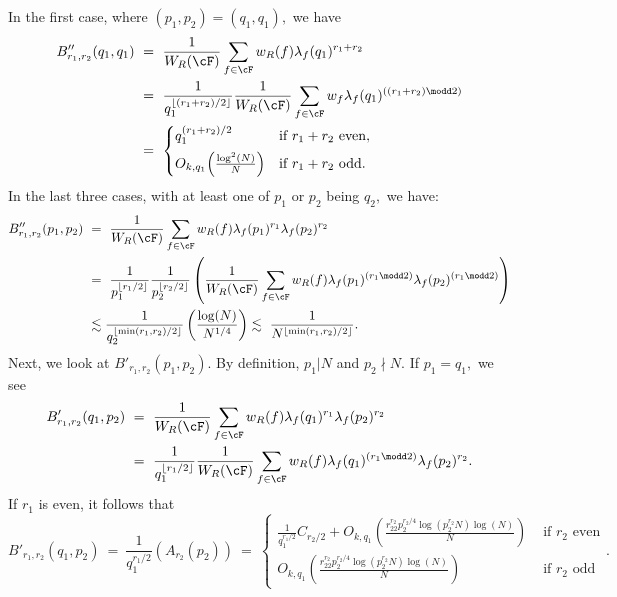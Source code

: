 \documentclass[11pt, reqno]{amsart}
\theoremstyle{definition}
\theoremstyle{remark}
\numberwithin{equation}{section}
\begin{document}
In the first case, where $(p_1 , p_2) = (q_1,q_1),$ we have \begin{align*}
    B''_{r_1,r_2}(q_1,q_1) \ &= \ \frac{1}{W_R(\cF)} \sum_{f \in \cF} w_R(f) \lambda_f(q_1)^{r_1+r_2} \\&= \ \frac{1}{q_1^{\lfloor (r_1+r_2) / 2\rfloor}}\frac{1}{W_R(\cF)}\sum_{f \in \cF} w_f\lambda_f(q_1)^{((r_1+r_2)\modd 2)} \\
   &= \ \begin{cases}
    q_1^{(r_1+r_2) / 2} 
      & \text{if $r_1+r_2$ even}, \\[4pt]
    O_{k,q_1}\!\left(\frac{\log^2(N)}{N}\right) 
      & \text{if $r_1+r_2$ odd}.
\end{cases}
\end{align*}
In the last three cases, with at least one of $p_1$ or $p_2$ being $q_2,$ we have:
\begin{align*}
      B''_{r_1,r_2}(p_1,p_2)\ &=\ \frac{1}{W_R(\cF)} \sum_{f \in \cF} w_R(f) \lambda_f(p_1)^{r_1}\lambda_f(p_2)^{r_2} \\
     \ &=\ \frac{1}{p_1^{\lfloor r_1/2\rfloor}}\frac{1}{p_2^{\lfloor r_2/2\rfloor}}\left(\frac{1}{W_R(\cF)} \sum_{f \in \cF} w_R(f) \lambda_f(p_1)^{(r_1\modd 2)}\lambda_f(p_2)^{(r_1\modd 2)} \right)\\
      &\lesssim \frac{1}{q_2^{\lfloor \min(r_1,r_2)/2 \rfloor}} \left(\frac{\log(N)}{N^{1/4}}\right) \lesssim \ \frac{1}{N^{\lfloor \min(r_1,r_2)/2 \rfloor}}.
\end{align*}
Next, we look at $B'_{r_1,r_2}(p_1,p_2).$ By definition, $p_1 | N$ and $p_2 \nmid N.$ 
If $p_1 = q_1,$ we see
\begin{align*}
    B'_{r_1,r_2}(q_1,p_2)\ &= \ \frac{1}{W_R(\cF)} \sum_{f \in \cF} w_R(f) \lambda_f(q_1)^{r_1}\lambda_f(p_2)^{r_2} \\
   \ &=\ \frac{1}{q_1^{\lfloor r_1/2\rfloor}} \frac{1}{W_R(\cF)} \sum_{f \in \cF} w_R(f) \lambda_f(q_1)^{(r_1 \modd 2)}\lambda_f(p_2)^{r_2}.
\end{align*}
\noindent If $r_1 $ is even, it follows that $$B'_{r_1,r_2}(q_1,p_2) \ =\ 
        \frac{1}{q_1^{ r_1/2}} \left(A_{r_2}(p_2)\right)\ =\ \begin{cases}
         \frac{1}{q_1^{ r_1/2}} C_{r_2/2} + O_{k,q_1}\left(\frac{r_22^{r_2}p_2^{r_2/4}\log(p_2^{r_2}N)\log(N)}{N}\right)  &\text{ if $r_2$ even}   \\
         O_{k,q_1}\left(\frac{r_22^{r_2}p_2^{r_2/4}\log(p_2^{r_2}N)\log(N)}{N}\right)  &\text{ if $r_2$ odd}
        \end{cases}.$$
\end{document}
